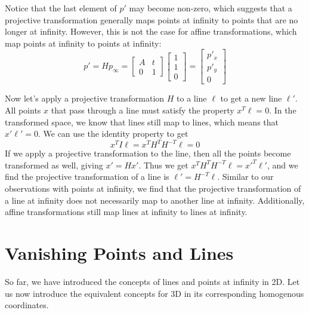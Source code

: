 \documentclass[a4paper, 12pt]{article}
\begin{document}
Notice that the last element of $p'$ may become non-zero, which suggests that a projective transformation generally maps points at infinity to points that are no longer at infinity. However, this is not the case for affine transformations, which map points at infinity to points at infinity:
\begin{equation}
p' =Hp_\infty = \begin{bmatrix} A &t \\ 0&1 \end{bmatrix}\begin{bmatrix}1\\1\\0\end{bmatrix} = \begin{bmatrix}p'_x\\ p'_y\\0\end{bmatrix}
\end{equation}

Now let's apply a projective transformation $H$ to a line $\ell$ to get a new line $\ell'$. All points $x$ that pass through a line must satisfy the property $x^T\ell = 0$. In the transformed space, we know that lines still map to lines, which means that $x'\ell' = 0$. We can use the identity property to get \[x^TI\ell = x^TH^T H^{-T} \ell = 0\]If we apply a projective transformation to the line, then all the points become transformed as well, giving $x' = Hx'$. Thus we get $x^TH^T H^{-T} \ell = x'^T\ell'$, and we find the projective transformation of a line is $\ell' = H^{-T}\ell$. Similar to our observations with points at infinity, we find that the projective transformation of a line at infinity does not necessarily map to another line at infinity. Additionally, affine transformations still map lines at infinity to lines at infinity.

\section{Vanishing Points and Lines}
So far, we have introduced the concepts of lines and points at infinity in 2D. Let us now introduce the equivalent concepts for 3D in its corresponding homogenous coordinates. 
\end{document}
